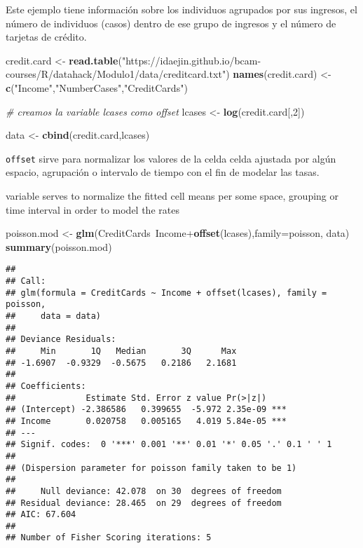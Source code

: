 \documentclass[]{article}
\newenvironment{Shaded}{\begin{snugshade}}{\end{snugshade}}
\newcommand{\KeywordTok}[1]{\textcolor[rgb]{0.13,0.29,0.53}{\textbf{{#1}}}}
\newcommand{\DataTypeTok}[1]{\textcolor[rgb]{0.13,0.29,0.53}{{#1}}}
\newcommand{\DecValTok}[1]{\textcolor[rgb]{0.00,0.00,0.81}{{#1}}}
\newcommand{\StringTok}[1]{\textcolor[rgb]{0.31,0.60,0.02}{{#1}}}
\newcommand{\CommentTok}[1]{\textcolor[rgb]{0.56,0.35,0.01}{\textit{{#1}}}}
\newcommand{\NormalTok}[1]{{#1}}
\numberwithin{equation}{section}
\begin{document}
Este ejemplo tiene información sobre los individuos agrupados por sus
ingresos, el número de individuos (casos) dentro de ese grupo de
ingresos y el número de tarjetas de crédito.

\begin{Shaded}
\begin{Highlighting}[]
\NormalTok{credit.card <-}\StringTok{ }\KeywordTok{read.table}\NormalTok{(}\StringTok{"https://idaejin.github.io/bcam-courses/R/datahack/Modulo1/data/creditcard.txt"}\NormalTok{)}
\KeywordTok{names}\NormalTok{(credit.card) <-}\StringTok{ }\KeywordTok{c}\NormalTok{(}\StringTok{"Income"}\NormalTok{,}\StringTok{"NumberCases"}\NormalTok{,}\StringTok{"CreditCards"}\NormalTok{)}

\CommentTok{# creamos la variable lcases como offset}
\NormalTok{lcases <-}\StringTok{ }\KeywordTok{log}\NormalTok{(credit.card[,}\DecValTok{2}\NormalTok{])}

\NormalTok{data <-}\StringTok{ }\KeywordTok{cbind}\NormalTok{(credit.card,lcases)}
\end{Highlighting}
\end{Shaded}

\texttt{offset} sirve para normalizar los valores de la celda celda
ajustada por algún espacio, agrupación o intervalo de tiempo con el fin
de modelar las tasas.

variable serves to normalize the fitted cell means per some space,
grouping or time interval in order to model the rates

\begin{Shaded}
\begin{Highlighting}[]
\NormalTok{poisson.mod <-}\StringTok{ }\KeywordTok{glm}\NormalTok{(CreditCards~Income+}\KeywordTok{offset}\NormalTok{(lcases),}\DataTypeTok{family=}\NormalTok{poisson, data)}
\KeywordTok{summary}\NormalTok{(poisson.mod)}
\end{Highlighting}
\end{Shaded}

\begin{verbatim}
## 
## Call:
## glm(formula = CreditCards ~ Income + offset(lcases), family = poisson, 
##     data = data)
## 
## Deviance Residuals: 
##     Min       1Q   Median       3Q      Max  
## -1.6907  -0.9329  -0.5675   0.2186   2.1681  
## 
## Coefficients:
##              Estimate Std. Error z value Pr(>|z|)    
## (Intercept) -2.386586   0.399655  -5.972 2.35e-09 ***
## Income       0.020758   0.005165   4.019 5.84e-05 ***
## ---
## Signif. codes:  0 '***' 0.001 '**' 0.01 '*' 0.05 '.' 0.1 ' ' 1
## 
## (Dispersion parameter for poisson family taken to be 1)
## 
##     Null deviance: 42.078  on 30  degrees of freedom
## Residual deviance: 28.465  on 29  degrees of freedom
## AIC: 67.604
## 
## Number of Fisher Scoring iterations: 5
\end{verbatim}
\end{document}
